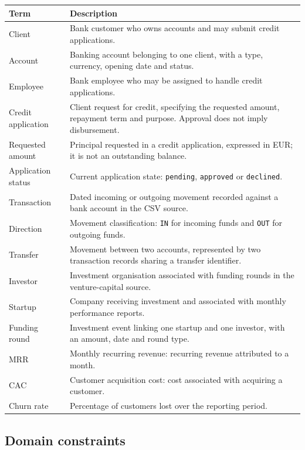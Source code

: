\documentclass[11pt,a4paper]{article}
\begin{document}
\begingroup
\renewcommand{\arraystretch}{1.2}
\begin{tabularx}{\textwidth}{@{}p{3.5cm} >{\raggedright\arraybackslash}X@{}}
\toprule
Term & Description\\
\midrule
Client & Bank customer who owns accounts and may submit credit applications.\\
Account & Banking account belonging to one client, with a type, currency, opening date and status.\\
Employee & Bank employee who may be assigned to handle credit applications.\\
Credit application & Client request for credit, specifying the requested amount, repayment term and purpose. Approval does not imply disbursement.\\
Requested amount & Principal requested in a credit application, expressed in EUR; it is not an outstanding balance.\\
Application status & Current application state: \texttt{pending}, \texttt{approved} or \texttt{declined}.\\
Transaction & Dated incoming or outgoing movement recorded against a bank account in the CSV source.\\
Direction & Movement classification: \texttt{IN} for incoming funds and \texttt{OUT} for outgoing funds.\\
Transfer & Movement between two accounts, represented by two transaction records sharing a transfer identifier.\\
Investor & Investment organisation associated with funding rounds in the venture-capital source.\\
Startup & Company receiving investment and associated with monthly performance reports.\\
Funding round & Investment event linking one startup and one investor, with an amount, date and round type.\\
MRR & Monthly recurring revenue: recurring revenue attributed to a month.\\
CAC & Customer acquisition cost: cost associated with acquiring a customer.\\
Churn rate & Percentage of customers lost over the reporting period.\\
\bottomrule
\end{tabularx}
\endgroup

\subsection{Domain constraints}
\end{document}
